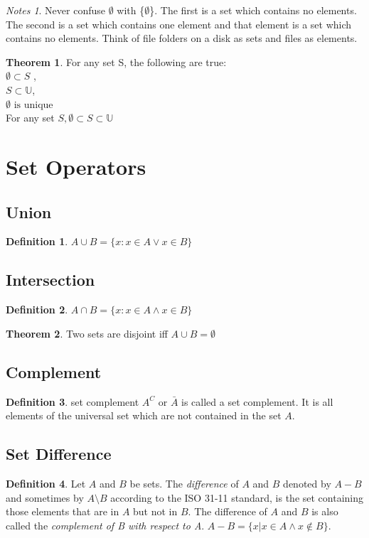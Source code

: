 \documentclass[11pt]{book} %
\theoremstyle {definition}
\newtheorem {definition}{Definition}[section]
\newtheorem {theorem}{Theorem}[section]
\theoremstyle {remark}
\newtheorem*{notes}{Notes}
\begin{document}
\begin{notes}
Never confuse $\emptyset$ with \{$\emptyset$\}. The first is a set which contains no elements. The second is a set which contains one element and that element is a set which contains no elements. Think of file folders on a disk as sets and files as elements.
\end{notes}

 \begin {theorem}
For any set S, the following are true:\\
$\emptyset \subset S$ , \\
$S \subset \mathbb{U}$, \\
$\emptyset \text{ is unique}$\\
For any set $S, \emptyset \subset S \subset \mathbb{U}$
\end {theorem}


\section {Set Operators}
    \subsection {Union}
\begin {definition} 
$A \cup B=\{x:x \in A \lor x \in B\}$
\end {definition}

    \subsection {Intersection}
\begin {definition}
$A \cap B = \{x:x \in A  \land x \in B\}$
\end {definition}

\begin {theorem}
Two sets are disjoint iff $A \cup B = \emptyset$
\end {theorem}

    \subsection {Complement}
\begin {definition} { set complement}
$A^C$ or $ \bar{A} $ is called a set complement. It is all elements of the universal set which are not contained in the set $A$.
\end {definition}

    \subsection {Set Difference}
\begin {definition}
Let $A$ and $B$ be sets. The \textit{difference} of $A$ and $B$ denoted by $A - B$ and sometimes by $A \setminus B$ according to the ISO 31-11 standard, is the set containing those elements that are in $A$ but not in $B$. The difference of $A$ and $B$ is also called the \textit{complement of B with respect to A}.
$A - B = \{x | x \in A \land x \notin B\}$.
\end {definition}
\end{document}
